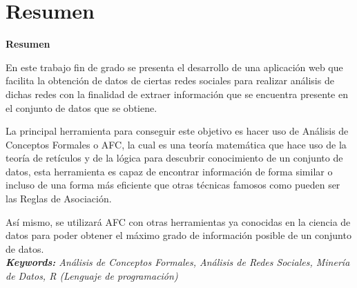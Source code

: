 \documentclass[../../main.tex]{subfiles}
\begin{document}
\makeatletter
\renewenvironment{abstract}{%
    \if@twocolumn
      \section*{Resumen \\}%
    \else %
    \begin{flushright}
        {\filleft\Huge\bfseries\fontsize{48pt}{12}\selectfont Resumen\vspace{\z@}}%
        \end{flushright}
      \quotation
    \fi}
    {\if@twocolumn\else\endquotation\fi}
\makeatother
\makeatletter
\renewenvironment{abstract}{%
    \if@twocolumn
      \section*{Resumen \\}%
    \else %
    \begin{flushright}
        {\filleft\Huge\bfseries\fontsize{48pt}{12}\selectfont Resumen\vspace{\z@}}%
        \end{flushright}
      \quotation
    \fi}
    {\if@twocolumn\else\endquotation\fi}
\makeatother
\begin{abstract}

En este trabajo fin de grado se presenta el desarrollo de una aplicación web que facilita la obtención de datos de ciertas redes sociales para realizar análisis de dichas redes con la finalidad de extraer información que se encuentra presente en el conjunto de datos que se obtiene. 

La principal herramienta para conseguir este objetivo es hacer uso de Análisis de Conceptos Formales o AFC, la cual es una teoría matemática que hace uso de la teoría de retículos y de la lógica para descubrir conocimiento de un conjunto de datos, esta herramienta es capaz de encontrar información de forma similar o incluso de una forma más eficiente que otras técnicas famosos como pueden ser las Reglas de Asociación.

Así mismo, se utilizará AFC con otras herramientas ya conocidas en la ciencia de datos para poder obtener el máximo grado de información posible de un conjunto de datos. \\

\noindent\textit{\textbf{Keywords:} Análisis de Conceptos Formales, Análisis de Redes Sociales, Minería de Datos, R (Lenguaje de programación)}
\end{abstract}
\end{document}
